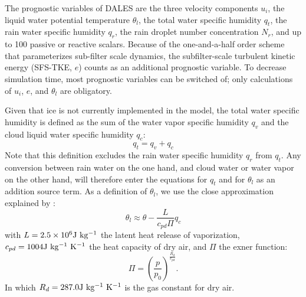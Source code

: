 The prognostic variables of DALES are the three velocity components $u_i$, the liquid water potential temperature $\theta_l$, the total water specific humidity $q_t$, the rain water specific humidity $q_r$, the rain droplet number concentration $N_r$, and up to 100 passive or reactive scalars. Because of the one-and-a-half order scheme that parameterizes sub-filter scale dynamics, the subfilter-scale turbulent kinetic energy (SFS-TKE, $e$) counts as an additional prognostic variable. To decrease simulation time, most prognostic variables can be switched of; only calculations of $u_i$, $e$, and $\theta_l$ are obligatory.

Given that ice is not currently implemented in the model, the total water specific humidity is defined as  the sum of the water vapor specific humidity $q_v$ and the cloud liquid water specific humidity $q_c$:
\begin{equation}
q_t = q_v + q_c
\end{equation}
 Note  that this definition excludes the rain water specific humidity $q_r$ from $q_t$. Any conversion between rain water on the one hand, and cloud water or water vapor on the other hand, will therefore enter the equations for $q_t$ and for $\theta_l$ as an addition source term. As a definition of $\theta_l$, we use the close approximation explained by \citet{emanuel1994}:
\begin{equation}
 \theta_l \approx \theta - \frac{L}{c_{pd}\Pi}q_c
\end{equation}
with $L=2.5\times10^6\mathrm{J\ kg^{-1}}$ the latent heat release of vaporization, $c_{pd}=1004\mathrm{J\ kg^{-1}\ K^{-1}}$ the heat capacity of dry air, and $\Pi$ the exner function:
\begin{equation}
\Pi = \left(\frac{p}{p_0}\right)^{\frac{R_d}{c_{pd}}}.
\end{equation}
In which $R_d=287.0 \mr{J\ kg^{-1}\ K^{-1}}$ is the gas constant for dry air.

